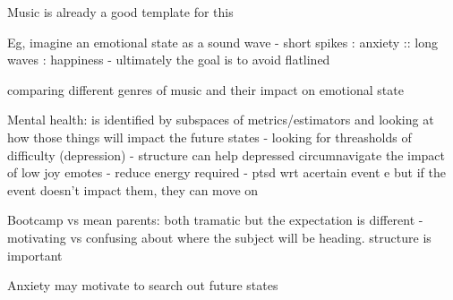 Music is already a good template for this

Eg, imagine an emotional state as a sound wave
- short spikes : anxiety :: long waves : happiness
- ultimately the goal is to avoid flatlined

comparing different genres of music and their impact on emotional state


Mental health: is identified by subspaces of metrics/estimators and looking at how those things will impact the future states
- looking for threasholds of difficulty (depression)
  - structure can help depressed circumnavigate the impact of low joy emotes
    - reduce energy required
- ptsd wrt  acertain event e but if the event doesn't impact them, they can move on

Bootcamp vs mean parents: both tramatic but the expectation is different
- motivating vs confusing about where the subject will be heading. structure is important


Anxiety may motivate to search out future states

